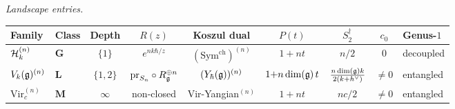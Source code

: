 \begin{computation}
\smallskip
\noindent
\emph{Landscape entries.}
\begin{center}
\small
\renewcommand{\arraystretch}{1.4}
\begin{tabular}{llccccccl}
\toprule
\textbf{Family}
 & \textbf{Class}
 & \textbf{Depth}
 & $R(z)$
 & \textbf{Koszul dual}
 & $P(t)$
 & $S_2^\dagger$
 & $c_0$
 & \textbf{Genus-$1$} \\
\midrule
$\mathcal{H}_k^{(n)}$
 & $\mathbf{G}$
 & $\{1\}$
 & $e^{nk\hbar/z}$
 & $(\mathrm{Sym}^{\mathrm{ch}})^{(n)}$
 & $1{+}nt$
 & $n/2$
 & $0$
 & decoupled \\[3pt]
$V_k(\mathfrak{g})^{(n)}$
 & $\mathbf{L}$
 & $\{1,2\}$
 & $\mathrm{pr}_{S_n}\circ R_{\mathfrak{g}}^{\oplus n}$
 & $(Y_\hbar(\mathfrak{g}))^{(n)}$
 & $1{+}n\dim(\mathfrak{g})\,t$
 & $\frac{n\dim(\mathfrak{g})k}{2(k{+}h^\vee)}$
 & $\ne 0$
 & entangled \\[3pt]
$\mathrm{Vir}_c^{(n)}$
 & $\mathbf{M}$
 & $\infty$
 & non-closed
 & Vir-Yangian${}^{(n)}$
 & $1{+}nt$
 & $nc/2$
 & $\ne 0$
 & entangled \\
\bottomrule
\end{tabular}
\end{center}
\end{computation}

